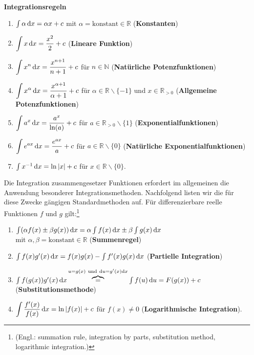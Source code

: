 \medskip
\noindent
{\bf Integrationsregeln}
%
\begin{enumerate}
\item $\int \alpha\,{\rm d}x = \alpha x + c$ mit $\alpha
= \text{konstant} \in \mathbb{R}$ \hfill ({\bf Konstanten})
\item $\displaystyle \int x\,{\rm d}x = \frac{x^{2}}{2} + c$
 \hfill ({\bf Lineare Funktion})
\item $\displaystyle \int x^{n}\,{\rm d}x = \frac{x^{n+1}}{n+1} + c$
f\"ur $n \in \mathbb{N}$ \hfill ({\bf Nat\"urliche Potenzfunktionen})
\item $\displaystyle \int x^{\alpha}\,{\rm d}x = \frac{x^{\alpha+1}}{\alpha+1}
+ c$ f\"ur $\alpha \in \mathbb{R}\backslash\{-1\}$ und
$x \in \mathbb{R}_{> 0}$
\hfill ({\bf Allgemeine Potenzfunktionen})
\item $\displaystyle \int a^{x}\,{\rm d}x = \frac{a^{x}}{\ln(a)} + c$
f\"ur $a \in \mathbb{R}_{> 0}\backslash\{1\}$
\hfill ({\bf Exponentialfunktionen})
\item $\displaystyle \int e^{ax}\,{\rm d}x = \frac{e^{ax}}{a} + c$
f\"ur $a \in \mathbb{R}\backslash\{0\}$
\hfill ({\bf Nat\"urliche Exponentialfunktionen})
\item $\int x^{-1}\,{\rm d}x = \ln|x| + c$
f\"ur $x \in \mathbb{R}\backslash\{0\}$.
\end{enumerate}
%
Die Integration zusammengesetzer Funktionen erfordert
im allgemeinen die Anwendung besonderer Integrationsmethoden.
Nachfolgend listen wir die f\"ur diese Zwecke g\"angigen
Standardmethoden auf. F\"ur differenzierbare reelle
Funktionen $f$ und $g$ gilt:\footnote{(Engl.: summation rule, 
integration by parts, substitution method, logarithmic 
integration.)}
%
\begin{enumerate}
\item $\int(\alpha f(x) \pm \beta g(x))\,{\rm d}x
= \alpha\int f(x)\,{\rm d}x \pm \beta\int g(x)\,{\rm d}x$ \\
mit $\alpha,\beta = \text{konstant} \in \mathbb{R}$
\hfill ({\bf Summenregel})
\item $\int f(x)g^{\prime}(x)\,{\rm d}x = f(x)g(x)
- \int f^{\prime}(x)g(x)\,{\rm d}x$
\hfill ({\bf Partielle Integration})
\item $\int f(g(x))g^{\prime}(x)\,{\rm d}x
\overbrace{=}^{u=g(x)\ \text{und}\ {\rm d}u=g^{\prime}(x){\rm d}x}
\int f(u)\,{\rm d}u = F(g(x)) + c$
\hfill ({\bf Substitutionsmethode})
\item $\displaystyle \int\frac{f^{\prime}(x)}{f(x)}\,{\rm d}x
= \ln|f(x)| + c$ f\"ur $f(x) \neq 0$
\hfill ({\bf Logarithmische Integration}).
\end{enumerate}
%

